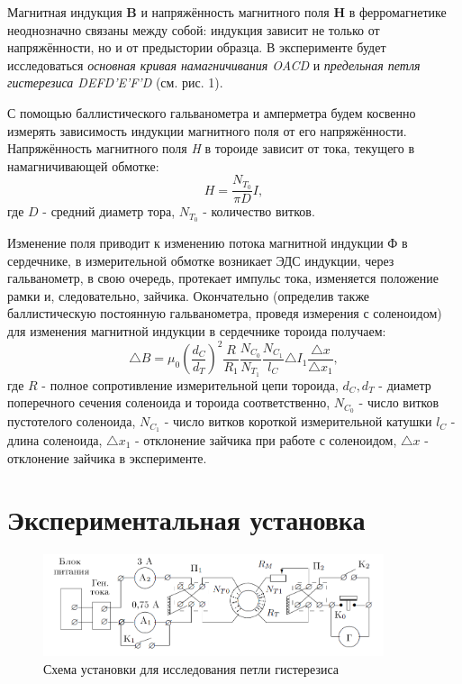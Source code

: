 \documentclass[a4paper]{article}
\begin{document}
Магнитная индукция \textbf{B} и напряжённость магнитного поля \textbf{H} в ферромагнетике неоднозначно связаны между собой: индукция зависит не только от напряжённости, но и от предыстории образца. В эксперименте будет исследоваться \textit{основная кривая намагничивания OACD} и \textit{предельная петля гистерезиса DEFD'E'F'D} (см. рис. 1).

С помощью баллистического гальванометра и амперметра будем косвенно измерять зависимость индукции магнитного поля от его напряжённости. \\
Напряжённость магнитного поля \textit{H} в тороиде зависит от тока, текущего в намагничивающей обмотке:
\begin{equation}
    H = \frac{N_{T_0}}{\pi D}I,
\end{equation}
где $D$ - средний диаметр тора, $N_{T_0}$ - количество витков.

Изменение поля приводит к изменению потока магнитной индукции Ф в сердечнике, в измерительной обмотке возникает ЭДС индукции, через гальванометр, в свою очередь, протекает импульс тока, изменяется положение рамки и, следовательно, зайчика. Окончательно (определив также баллистическую постоянную гальванометра, проведя измерения с соленоидом) для изменения магнитной индукции в сердечнике тороида получаем:
\begin{equation}
    \triangle B = \mu_0 (\frac{d_C}{d_T})^2 \frac{R}{R_1} \frac{N_{C_0}}{N_{T_1}} \frac{N_{C_1}}{l_C} \triangle I_1 \frac{\triangle x}{\triangle x_1},
\end{equation}
где $R$ - полное сопротивление измерительной цепи тороида, $d_C, d_T$ - диаметр поперечного сечения соленоида и тороида соответственно, $N_{C_0}$  - число витков пустотелого соленоида, $N_{C_1}$ - число витков короткой измерительной катушки $l_C$ - длина соленоида, $\triangle x_1$ - отклонение зайчика при работе с соленоидом, $\triangle x$ - отклонение зайчика в эксперименте.

\section{Экспериментальная установка}

\begin{figure}[h]
    \centering
    \includegraphics[width=10cm]{fig2.PNG}
    \caption{Схема установки для исследования петли гистерезиса}
    \label{fig:vac}
\end{figure}
\end{document}
